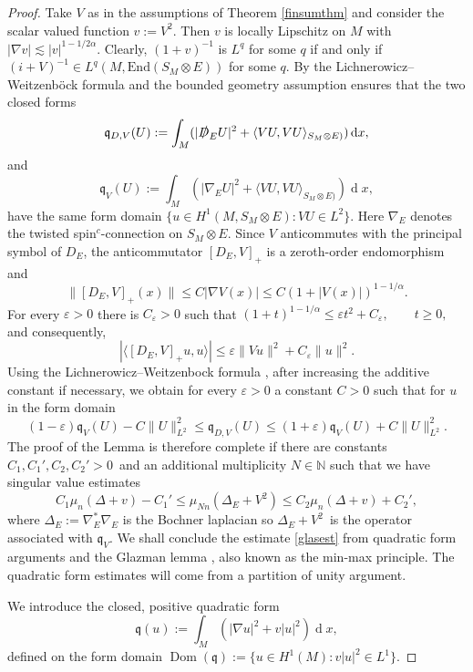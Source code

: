 \documentclass[a4paper,reqno]{amsart}
\numberwithin{equation}{section}
\def\Dom{\operatorname{Dom}}
\def\rd{\operatorname{d}\!}
\def\N{\mathbb{N}}
\theoremstyle{definition}
\theoremstyle{remark}
\begin{document}
\begin{proof}
Take $V$ as in the assumptions of Theorem \ref{finsumthm} and consider the scalar valued function $v:=V^2$. Then $v$ is locally Lipschitz on $M$ with $|\nabla v|\lesssim |v|^{1-1/2\alpha}$. Clearly, $(1+v)^{-1}$ is $L^q$ for some $q$ if and only if $(i+V)^{-1}\in L^q(M,\mathrm{End}(S_M\otimes E))$ for some $q$. By the Lichnerowicz–Weitzenböck formula \cite{BGV} and the bounded geometry assumption ensures that the two closed forms
$$\mathfrak{q}_{D,V}(U):=\int_M (|\slashed{D}_E U|^2+\langle VU,VU\rangle_{S_M\otimes E)})\rd x,$$
and 
$$\mathfrak{q}_V(U):=\int_M (|\nabla_E U|^2+\langle VU,VU\rangle_{S_M\otimes E)})\rd x,$$
have the same form domain $\{u\in H^1(M,S_M\otimes E): VU\in L^2\}$. Here $\nabla_E$ denotes the twisted spin$^c$-connection on $S_M\otimes E$. Since $V$ anticommutes with the principal symbol of $D_E$, the anticommutator $[D_E,V]_+$ is a zeroth-order endomorphism and
\[\|[D_E,V]_+(x)\|\le C|\nabla V(x)| \le C(1+|V(x)|)^{1-1/\alpha}.\]
For every $\varepsilon>0$ there is $C_\varepsilon>0$ such that $(1+t)^{1-1/\alpha}\le \varepsilon t^2+C_\varepsilon, \qquad t\ge0,$ and consequently,
\[|\langle[D_E,V]_+u,u\rangle| \le \varepsilon\|Vu\|^2+C_\varepsilon\|u\|^2.\]
Using the Lichnerowicz--Weitzenbock formula  \cite{BGV}, after increasing the additive constant if necessary, we obtain for every $\varepsilon>0$ a constant $C>0$ such that for $u$ in the form domain
$$(1-\varepsilon)\mathfrak{q}_V(U)-C\|U\|_{L^2}^2\leq \mathfrak{q}_{D,V}(U)\leq (1+\varepsilon)\mathfrak{q}_V(U)+C\|U\|_{L^2}^2.$$
The proof of the Lemma is therefore complete if there are constants $C_1,C_1',C_2,C_2'>0$ and an additional multiplicity $N\in \N$ such that we have singular value estimates
\begin{equation}
\label{glasest}
C_1\mu_n(\Delta+v)-C_1'\leq \mu_{Nn}(\Delta_E+V^2)\leq C_2\mu_n(\Delta+v)+C_2',
\end{equation}
where $\Delta_E:=\nabla_E^*\nabla_E$ is the Bochner laplacian so $\Delta_E+V^2$ is the operator associated with $\mathfrak{q}_V$. We shall conclude the estimate \eqref{glasest} from quadratic form arguments and the Glazman lemma \cite[Theorem 1.25]{franklapweid}, also known as the min-max principle. The quadratic form estimates will come from a partition of unity argument.


We introduce the closed, positive quadratic form 
$$\mathfrak{q}(u):=\int_M (|\nabla u|^2+v|u|^2)\rd x,$$
defined on the form domain $\Dom(\mathfrak{q}):=\{u\in H^1(M): v|u|^2\in L^1\}$. 



\end{proof}
\end{document}
